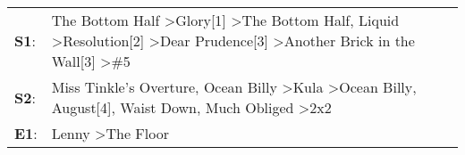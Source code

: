 \begin{supertabular}{p{0.03\textwidth}p{0.92\textwidth}}
 \textbf{S1}:  &  The Bottom Half\textsuperscript{} \textgreater \enspace Glory[1]\textsuperscript{} \textgreater \enspace The Bottom Half\textsuperscript{}, \enspace Liquid\textsuperscript{} \textgreater \enspace Resolution[2]\textsuperscript{} \textgreater \enspace Dear Prudence[3]\textsuperscript{} \textgreater \enspace Another Brick in the Wall[3]\textsuperscript{} \textgreater \enspace \#5\textsuperscript{}  \enspace  \\
 \textbf{S2}:  &                                                            Miss Tinkle's Overture\textsuperscript{}, \enspace Ocean Billy\textsuperscript{} \textgreater \enspace Kula\textsuperscript{} \textgreater \enspace Ocean Billy\textsuperscript{}, \enspace August[4]\textsuperscript{}, \enspace Waist Down\textsuperscript{}, \enspace Much Obliged\textsuperscript{} \textgreater \enspace 2x2\textsuperscript{}  \enspace  \\
 \textbf{E1}:  &                                                                                                                                                                                                                                                                                                                                      Lenny\textsuperscript{} \textgreater \enspace The Floor\textsuperscript{}  \enspace  \\
\end{supertabular}
